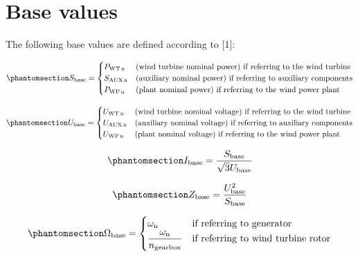 \documentclass[
  a4paper,
  DIV=11,
  numbers=noendperiod]{scrartcl}
\begin{document}
\section{Base values}\label{sec-baseValues}

The following base values are defined according to {[}1{]}:

\begin{equation}\phantomsection\label{eq-sBase}{ 
S_\mathrm{base} = 
\begin{cases}
P_\mathrm{WT\,n} &\mbox{(wind turbine nominal power) if referring to the wind turbine}\\
S_\mathrm{AUX\,n} &\mbox{(auxiliary nominal power) if referring to auxiliary components}\\
P_\mathrm{WP\,n} &\mbox{(plant nominal power) if referring to the wind power plant}
\end{cases}
}\end{equation}

\begin{equation}\phantomsection\label{eq-uBase}{ 
U_\mathrm{base} = 
\begin{cases}
U_\mathrm{WT\,n} &\mbox{(wind turbine nominal voltage) if referring to the wind turbine}\\
U_\mathrm{AUX\,n} &\mbox{(auxiliary nominal voltage) if referring to auxiliary components}\\
U_\mathrm{WP\,n} &\mbox{(plant nominal voltage) if referring to the wind power plant}
\end{cases}
}\end{equation}

\begin{equation}\phantomsection\label{eq-iBase}{ 
I_\mathrm{base} = \dfrac{S_\mathrm{base}}{\sqrt{3}U_\mathrm{base}}
}\end{equation}

\begin{equation}\phantomsection\label{eq-zBase}{ 
Z_\mathrm{base} = \dfrac{U_\mathrm{base}^2}{S_\mathrm{base}}
}\end{equation}

\begin{equation}\phantomsection\label{eq-omegaBase}{ 
\Omega_\mathrm{base} = 
\begin{cases}
\omega_\mathrm{n} &\mbox{if referring to generator}\\
\dfrac{\omega_\mathrm{n}}{n_\mathrm{gearbox}} & \mbox{if referring to wind turbine rotor}
\end{cases}
}\end{equation}
\end{document}
